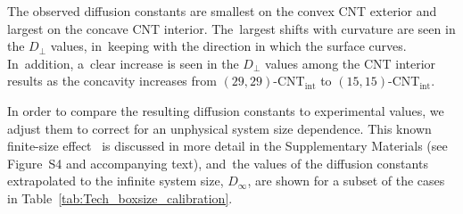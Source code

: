 \documentclass[molecules,article,accept,pdftex,moreauthors]{Definitions/mdpi}
\begin{document}
The observed diffusion constants are smallest on the convex CNT exterior and largest on the concave CNT interior. The~largest shifts with curvature are seen in the $D_\perp$ values, in~keeping with the direction in which the surface curves. In~addition, a~clear increase is seen in the $D_\perp$ values among the CNT interior results as the concavity increases from $(29,29)$-CNT$_\mathrm{int}$ to $(15,15)$-CNT$_\mathrm{int}$.

{In order to compare the resulting diffusion constants to experimental values, we adjust them to correct for an unphysical system size dependence. This known finite-size \linebreak effect~\cite{Fushiki2003PRE, Yeh2004JPCB, Simonnin2017, Jamali2018JCTC} is discussed in more detail in the Supplementary Materials %
 (see Figure~S4 and accompanying text), and~the values of the diffusion constants extrapolated to the infinite system size, $D_{\infty}$, are shown for a subset of the cases in Table~\ref{tab:Tech_boxsize_calibration}.  }
\end{document}
